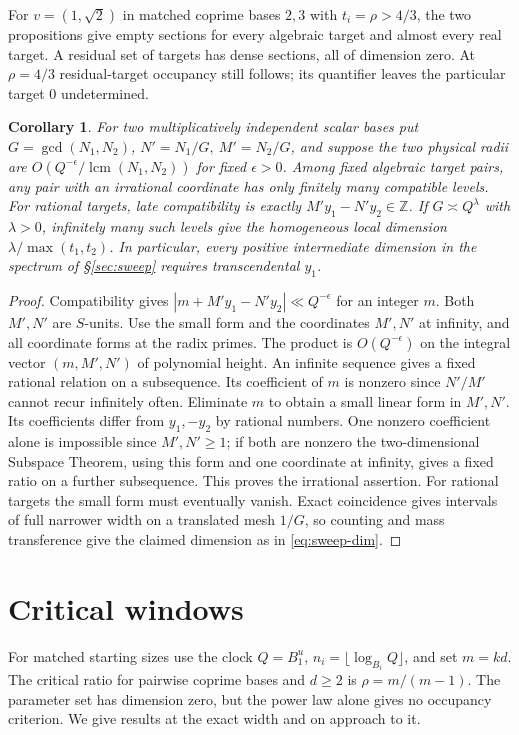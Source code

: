 \documentclass[11pt,reqno,a4paper]{amsart}
\newtheorem{corollary}[theorem]{Corollary}
\theoremstyle{remark}
\numberwithin{equation}{section}
\begin{document}
For \(v=(1,\sqrt2)\) in matched coprime bases \(2,3\) with \(t_i=\rho>4/3\), the two propositions give empty sections for every algebraic target and almost every real target. A residual set of targets has dense sections, all of dimension zero. At \(\rho=4/3\) residual-target occupancy still follows; its quantifier leaves the particular target \(0\) undetermined.

\begin{corollary}\label{cor:dichotomy}
For two multiplicatively independent scalar bases put \(G=\gcd(N_1,N_2)\), \(N'=N_1/G,\ M'=N_2/G\), and suppose the two physical radii are \(O(Q^{-\epsilon}/\operatorname{lcm}(N_1,N_2))\) for fixed \(\epsilon>0\). Among fixed algebraic target pairs, any pair with an irrational coordinate has only finitely many compatible levels. For rational targets, late compatibility is exactly \(M'y_1-N'y_2\in\mathbb Z\). If \(G\asymp Q^\lambda\) with \(\lambda>0\), infinitely many such levels give the homogeneous local dimension \(\lambda/\max(t_1,t_2)\). In particular, every positive intermediate dimension in the spectrum of \S\ref{sec:sweep} requires transcendental \(y_1\).
\end{corollary}
\begin{proof}
Compatibility gives \(|m+M'y_1-N'y_2|\ll Q^{-\epsilon}\) for an integer \(m\). Both \(M',N'\) are \(S\)-units. Use the small form and the coordinates \(M',N'\) at infinity, and all coordinate forms at the radix primes. The product is \(O(Q^{-\epsilon})\) on the integral vector \((m,M',N')\) of polynomial height. An infinite sequence gives a fixed rational relation on a subsequence. Its coefficient of \(m\) is nonzero since \(N'/M'\) cannot recur infinitely often. Eliminate \(m\) to obtain a small linear form in \(M',N'\). Its coefficients differ from \(y_1,-y_2\) by rational numbers. One nonzero coefficient alone is impossible since \(M',N'\ge1\); if both are nonzero the two-dimensional Subspace Theorem, using this form and one coordinate at infinity, gives a fixed ratio on a further subsequence. This proves the irrational assertion. For rational targets the small form must eventually vanish. Exact coincidence gives intervals of full narrower width on a translated mesh \(1/G\), so counting and mass transference give the claimed dimension as in \eqref{eq:sweep-dim}.
\end{proof}

\section{Critical windows}\label{sec:critical}
For matched starting sizes use the clock \(Q=B_1^u\),
\(n_i=\lfloor\log_{B_i} Q\rfloor\), and set \(m=kd\). The critical ratio for pairwise coprime bases and \(d\ge2\) is \(\rho=m/(m-1)\). The parameter set has dimension zero, but the power law alone gives no occupancy criterion. We give results at the exact width and on approach to it.
\end{document}
